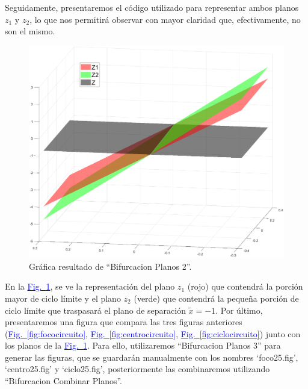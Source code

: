 \documentclass[12pt,a4paper]{report} %
\newcommand{\fref}[1]{\hyperref[#1]{\textcolor{blue}{Fig.~\ref*{#1}}}}
\newcommand{\fref}[1]{\hyperref[#1]{\textcolor{blue}{\textit{Fig.~\ref*{#1}}}}}
\begin{document}
	\vspace{0.5cm}Seguidamente, presentaremos el código utilizado para representar ambos planos $z_1$ y $z_2$, lo que nos permitirá observar con mayor claridad que, efectivamente, no son el mismo.
	
	\vspace{0.5cm}
	
	\newpage
	
	\begin{figure}[h]
		\centering
		\includegraphics[width=1\textwidth]{planoscircuito.eps}
		\caption{Gráfica resultado de ``Bifurcacion Planos 2''.}
		\label{fig:planoscircuito}
	\end{figure}\smallskip
	
	\vspace{0.5cm} En la \fref{fig:planoscircuito}, se ve la representación del plano $z_1$ (rojo) que contendrá la porción mayor de ciclo límite y el plano $z_2$ (verde) que contendrá la pequeña porción de ciclo límite que traspasará el plano de separación $\tilde{x}=-1$. Por último, presentaremos una figura que compara las tres figuras anteriores (\fref{fig:fococircuito}, \fref{fig:centrocircuito}, \fref{fig:ciclocircuito}) junto con los planos de la \fref{fig:planoscircuito}. Para ello, utilizaremos ``Bifurcacion Planos 3'' para generar las figuras, que se guardarán manualmente con los nombres `foco25.fig', `centro25.fig' y `ciclo25.fig', posteriormente las combinaremos utilizando ``Bifurcacion Combinar Planos''.
	\newpage
	
\end{document}

